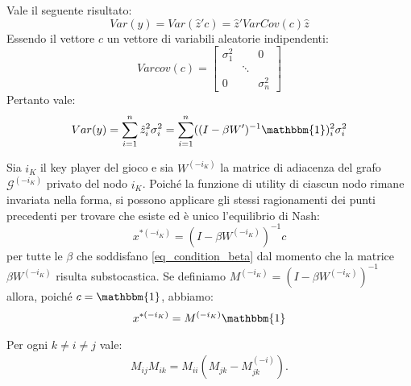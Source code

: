 \begin{alphaparts}
    \questionpart
    Vale il seguente risultato:
    \[
    Var(y) = Var(\hat{z}'c) = \hat{z}'VarCov(c)\hat{z}    
    \]
    Essendo il vettore \(c\) un vettore di variabili aleatorie indipendenti:
    \[
    Varcov(c) = \begin{bmatrix}
        \sigma_1^2 & & 0 \\
         & \ddots & \\
         0 & & \sigma_n^2
    \end{bmatrix}    
    \]
    Pertanto vale:
    \[Var(y) =  \sum \limits_{i = 1}^{n} \hat{z}_i^2 \sigma_i^2 =  \sum \limits_{i = 1}^{n} ((I - \beta W')^{-1}\mathbbm{1})_i^2 \sigma_i^2\]

    \questionpart
    Sia \(i_K\) il key player del gioco e sia \(W^{(- i_K)}\) la matrice di adiacenza del grafo \(\mathcal{G}^{(- i_K)}\) privato del nodo \(i_K\). Poiché la funzione di utility di ciascun nodo rimane invariata nella forma, si possono applicare gli stessi ragionamenti dei punti precedenti per trovare che esiste ed è unico l'equilibrio di Nash:
    \[
    x^{*(- i_K)} = (I- \beta W^{(- i_K)})^{- 1}c  
    \]
    per tutte le \(\beta\) che soddisfano \ref{eq_condition_beta} dal momento che la matrice \(\beta W^{(- i_K)}\) risulta substocastica. Se definiamo \(M^{(- i_K)} = (I- \beta W^{(- i_K)})^{- 1}\) allora, poiché \(c= \mathbbm{1}\), abbiamo: 
    \begin{equation}    
            x^{*(- i_K)} = M^{(- i_K)} \mathbbm{1}
    \end{equation}
    
    \questionpart
    Per ogni \(k \neq i \neq j\) vale:
    \begin{gather*}
        M_{ij}M_{ik} = M_{ii}(M_{jk}-M_{jk}^{(-i)}).
    \end{gather*}


\end{alphaparts}
